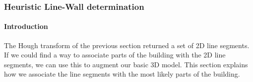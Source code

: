 \documentclass[10pt]{article}
\begin{document}
\subsubsection{Heuristic Line-Wall determination}
%
% 
% 

	\paragraph{Introduction}
	The Hough transform of the previous section returned a set of 2D line
	segments.  If we could find a way to associate parts of the building with
	the 2D line segments, we can use this to augment our basic 3D model.
	This section explains how we associate the line segments with the most
	likely parts of the building. \\
\end{document}

